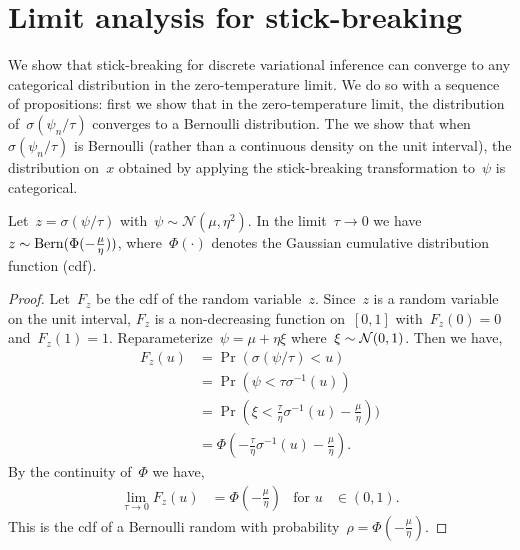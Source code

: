 \section{Limit analysis for stick-breaking}

We show that stick-breaking for discrete variational inference can
converge to any categorical distribution in the zero-temperature
limit.  We do so with a sequence of propositions: first we show that
in the zero-temperature limit, the distribution
of~${\sigma(\psi_n / \tau)}$ converges to a Bernoulli distribution.
The we show that when~$\sigma(\psi_n / \tau)$ is Bernoulli (rather
than a continuous density on the unit interval), the distribution
on~$x$ obtained by applying the stick-breaking transformation
to~$\psi$ is categorical.

\begin{proposition}
  \label{prop:bernoulli}
  Let~${z=\sigma(\psi / \tau)}$
  with~${\psi\sim\mathcal{N}(\mu,\eta^2)}$.  In the
  limit~${\tau \to
    0}$ we have~${z \sim \mathrm{Bern}(\Phi(-\tfrac{\mu}{\eta}))}$,
  where~$\Phi(\cdot)$ denotes the Gaussian cumulative distribution
  function (cdf). 
\end{proposition}

\begin{proof}
  Let~$F_z$ be the cdf of the random variable~$z$. Since~$z$ is a random
  variable on the unit interval, $F_z$ is a non-decreasing function
  on~$[0,1]$ with~${F_z(0)=0}$ and~${F_z(1)=1}$.
  Reparameterize~${\psi = \mu + \eta \xi}$
  where~${\xi \sim \mathcal{N}(0,1)}$. Then we have,
  \begin{align*}
    F_z(u) &= \Pr(\sigma(\psi / \tau) < u) \\
         &= \Pr(\psi < \tau \sigma^{-1}(u)) \\
         &= \Pr(\xi < \tfrac{\tau}{\eta} \sigma^{-1}(u) - \tfrac{\mu}{\eta}))\\
         &= \Phi(-\tfrac{\tau}{\eta}\sigma^{-1}(u) - \tfrac{\mu}{\eta}).
  \end{align*}
  By the continuity of~$\Phi$ we have,
  \begin{align*}
    \lim_{\tau \to 0} F_z(u) &= \Phi(-\tfrac{\mu}{\eta}) &
    \text{for } u &\in (0,1).
  \end{align*}
  This is the cdf of a Bernoulli random with
  probability~${\rho = \Phi(-\tfrac{\mu}{\eta})}$.
\end{proof}

